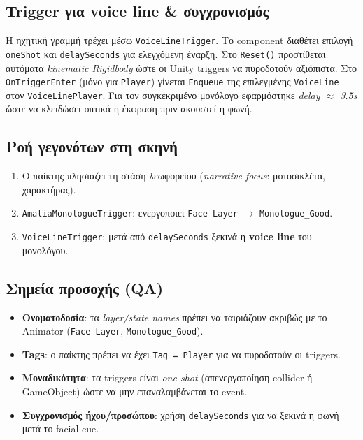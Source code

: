 \subsection*{Trigger για voice line \& συγχρονισμός}
Η ηχητική γραμμή τρέχει μέσω \texttt{VoiceLineTrigger}. Το component διαθέτει επιλογή \texttt{oneShot} και \texttt{delaySeconds} για ελεγχόμενη έναρξη. Στο \texttt{Reset()} προστίθεται αυτόματα \emph{kinematic Rigidbody} ώστε οι Unity triggers να πυροδοτούν αξιόπιστα. Στο \texttt{OnTriggerEnter} (μόνο για \texttt{Player}) γίνεται \texttt{Enqueue} της επιλεγμένης \texttt{VoiceLine} στον \texttt{VoiceLinePlayer}. Για τον συγκεκριμένο μονόλογο εφαρμόστηκε \emph{delay $\approx$ 3.5s} ώστε να κλειδώσει οπτικά η έκφραση πριν ακουστεί η φωνή.

\subsection*{Ροή γεγονότων στη σκηνή}
\begin{enumerate}
  \item Ο παίκτης πλησιάζει τη στάση λεωφορείου (\emph{narrative focus}: μοτοσικλέτα, χαρακτήρας).
  \item \texttt{AmaliaMonologueTrigger}: ενεργοποιεί \texttt{Face Layer} $\rightarrow$ \texttt{Monologue\_Good}.
  \item \texttt{VoiceLineTrigger}: μετά από \texttt{delaySeconds} ξεκινά η \textbf{voice line} του μονολόγου.
\end{enumerate}

\subsection*{Σημεία προσοχής (QA)}
\begin{itemize}
  \item \textbf{Ονοματοδοσία}: τα \textit{layer/state names} πρέπει να ταιριάζουν ακριβώς με το Animator (\texttt{Face Layer}, \texttt{Monologue\_Good}).
  \item \textbf{Tags}: ο παίκτης πρέπει να έχει \texttt{Tag = Player} για να πυροδοτούν οι triggers. 
  \item \textbf{Μοναδικότητα}: τα triggers είναι \emph{one-shot} (απενεργοποίηση collider ή GameObject) ώστε να μην επαναλαμβάνεται το event. 
  \item \textbf{Συγχρονισμός ήχου/προσώπου}: χρήση \texttt{delaySeconds} για να ξεκινά η φωνή μετά το facial cue.
\end{itemize}

